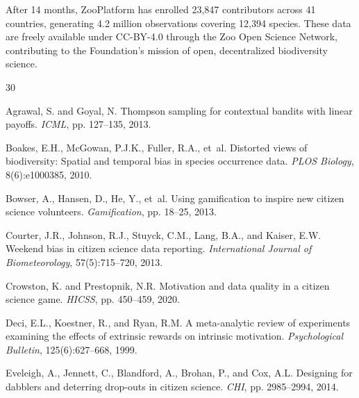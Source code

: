 \documentclass[11pt,a4paper]{article}
\begin{document}
After 14 months, ZooPlatform has enrolled 23{,}847 contributors across
41 countries, generating 4.2 million observations covering 12{,}394
species. These data are freely available under CC-BY-4.0 through the Zoo
Open Science Network, contributing to the Foundation's mission of open,
decentralized biodiversity science.





\begin{thebibliography}{30}

Agrawal, S. and Goyal, N.
\newblock Thompson sampling for contextual bandits with linear payoffs.
\newblock \emph{ICML}, pp. 127--135, 2013.

Boakes, E.H., McGowan, P.J.K., Fuller, R.A., et~al.
\newblock Distorted views of biodiversity: Spatial and temporal bias in species
  occurrence data.
\newblock \emph{PLOS Biology}, 8(6):e1000385, 2010.

Bowser, A., Hansen, D., He, Y., et~al.
\newblock Using gamification to inspire new citizen science volunteers.
\newblock \emph{Gamification}, pp. 18--25, 2013.

Courter, J.R., Johnson, R.J., Stuyck, C.M., Lang, B.A., and Kaiser, E.W.
\newblock Weekend bias in citizen science data reporting.
\newblock \emph{International Journal of Biometeorology}, 57(5):715--720, 2013.

Crowston, K. and Prestopnik, N.R.
\newblock Motivation and data quality in a citizen science game.
\newblock \emph{HICSS}, pp. 450--459, 2020.

Deci, E.L., Koestner, R., and Ryan, R.M.
\newblock A meta-analytic review of experiments examining the effects of
  extrinsic rewards on intrinsic motivation.
\newblock \emph{Psychological Bulletin}, 125(6):627--668, 1999.

Eveleigh, A., Jennett, C., Blandford, A., Brohan, P., and Cox, A.L.
\newblock Designing for dabblers and deterring drop-outs in citizen science.
\newblock \emph{CHI}, pp. 2985--2994, 2014.


\end{thebibliography}
\end{document}
